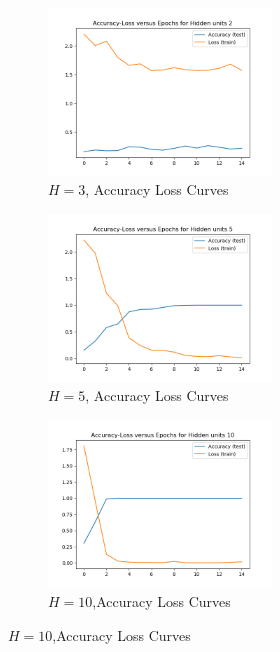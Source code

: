 \begin{figure}[!htbp]
\begin{subfigure}
\centering
\includegraphics[angle=0,width=0.65\textwidth]{assign-3/logs/Q2-A-L-2.png}
\caption{$H=3$, Accuracy Loss Curves}
\end{subfigure}
\begin{subfigure}
\centering
\includegraphics[angle=0,width=0.65\textwidth]{assign-3/logs/Q2-A-L-5.png}
\caption{$H=5$, Accuracy Loss Curves}
\end{subfigure}
\begin{subfigure}
\centering
\includegraphics[angle=0,width=0.65\textwidth]{assign-3/logs/Q2-A-L-10.png}
\caption{$H=10$,Accuracy Loss Curves}
\end{subfigure}
\end{figure}

